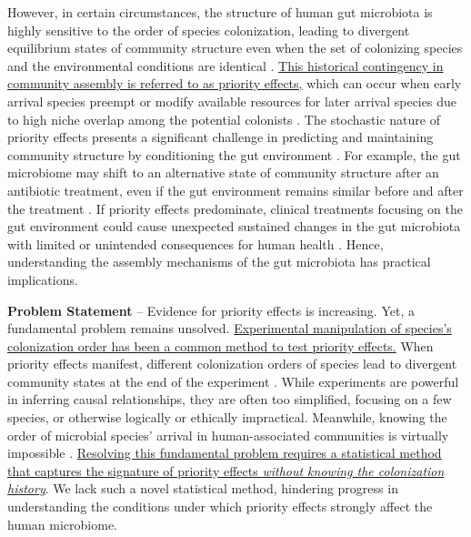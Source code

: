 \documentclass[12pt, class=article, crop=false]{standalone}
\begin{document}
However, in certain circumstances, the structure of human gut microbiota is highly sensitive to the order of species colonization, leading to divergent equilibrium states of community structure even when the set of colonizing species and the environmental conditions are identical \citep{fierer_animalcules_2012, david_host_2014, akagawa_effect_2019, ojima_priority_2022, debray_priority_2022}.
\ul{This historical contingency in community assembly is referred to as priority effects,} which can occur when early arrival species preempt or modify available resources for later arrival species due to high niche overlap among the potential colonists \citep{ke_coexistence_2018}.
The stochastic nature of priority effects presents a significant challenge in predicting and maintaining community structure by conditioning the gut environment \citep{fukami_historical_2015}.
For example, the gut microbiome may shift to an alternative state of community structure after an antibiotic treatment, even if the gut environment remains similar before and after the treatment \citep{dethlefsen_incomplete_2011, jakobsson_short-term_2010}.
If priority effects predominate, clinical treatments focusing on the gut environment could cause unexpected sustained changes in the gut microbiota with limited or unintended consequences for human health \citep{fierer_animalcules_2012}. 
Hence, understanding the assembly mechanisms of the gut microbiota has practical implications.

\textbf{Problem Statement} --
Evidence for priority effects is increasing.
Yet, a fundamental problem remains unsolved.
\ul{Experimental manipulation of species's colonization order has been a common method to test priority effects.}
When priority effects manifest, different colonization orders of species lead to divergent community states at the end of the experiment \citep{fukami_historical_2015, sprockett_role_2018}.
While experiments are powerful in inferring causal relationships, they are often too simplified, focusing on a few species, or otherwise logically or ethically impractical.
Meanwhile, knowing the order of microbial species' arrival in human-associated communities is virtually impossible \citep{sprockett_role_2018}.
\ul{Resolving this fundamental problem requires a statistical method that captures the signature of priority effects \textit{without knowing the colonization history}}.
We lack such a novel statistical method, hindering progress in understanding the conditions under which priority effects strongly affect the human microbiome.
\end{document}
